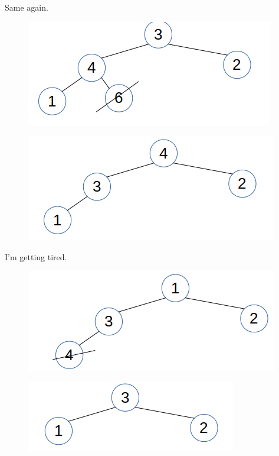 \documentclass{article}
\begin{document}
Same again. 

\begin{figure}[H]
\includegraphics[scale=0.5]{./P16/r6}
\centering
\end{figure}


\begin{figure}[H]
\includegraphics[scale=0.5]{./P16/m4}
\centering
\end{figure}

I'm getting tired. 

\begin{figure}[H]
\includegraphics[scale=0.5]{./P16/r4}
\centering
\end{figure}

\begin{figure}[H]
\includegraphics[scale=0.5]{./P16/m3}
\centering
\end{figure}
\end{document}

